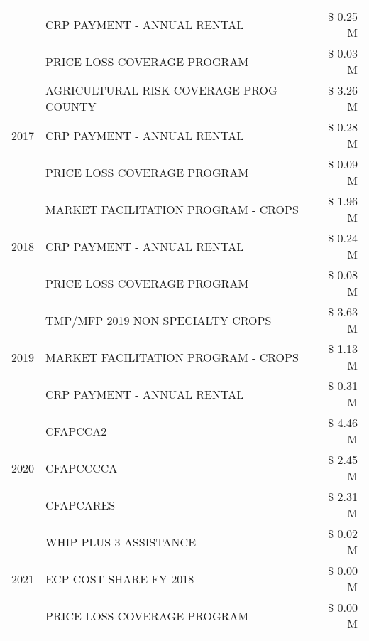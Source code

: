 \begin{tabular}{llr}
 & CRP PAYMENT - ANNUAL RENTAL & \$ 0.25 M \\
 & PRICE LOSS COVERAGE PROGRAM & \$ 0.03 M \\
\cline{1-3}
\multirow[t]{3}{*}{2017} & AGRICULTURAL RISK COVERAGE PROG - COUNTY & \$ 3.26 M \\
 & CRP PAYMENT - ANNUAL RENTAL & \$ 0.28 M \\
 & PRICE LOSS COVERAGE PROGRAM & \$ 0.09 M \\
\cline{1-3}
\multirow[t]{3}{*}{2018} & MARKET FACILITATION PROGRAM - CROPS & \$ 1.96 M \\
 & CRP PAYMENT - ANNUAL RENTAL & \$ 0.24 M \\
 & PRICE LOSS COVERAGE PROGRAM & \$ 0.08 M \\
\cline{1-3}
\multirow[t]{3}{*}{2019} & TMP/MFP 2019 NON SPECIALTY CROPS & \$ 3.63 M \\
 & MARKET FACILITATION PROGRAM - CROPS & \$ 1.13 M \\
 & CRP PAYMENT - ANNUAL RENTAL & \$ 0.31 M \\
\cline{1-3}
\multirow[t]{3}{*}{2020} & CFAPCCA2 & \$ 4.46 M \\
 & CFAPCCCCA & \$ 2.45 M \\
 & CFAPCARES & \$ 2.31 M \\
\cline{1-3}
\multirow[t]{3}{*}{2021} & WHIP PLUS 3 ASSISTANCE & \$ 0.02 M \\
 & ECP COST SHARE FY 2018 & \$ 0.00 M \\
 & PRICE LOSS COVERAGE PROGRAM & \$ 0.00 M \\
\cline{1-3}
\bottomrule
\end{tabular}
